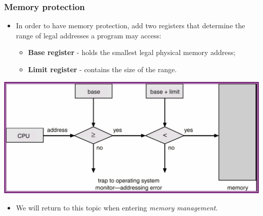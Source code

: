 \documentclass[CJKutf8,xcolor=pdftex,dvipsnames,table]{beamer}
\begin{document}
\begin{CJK*}{UTF8}{song}
  \begin{frame}
    \frametitle{Memory protection} \pause
    \begin{itemize}
    \item{In order to have memory protection, add two registers that determine the range of legal addresses a program may access:} \pause
      \begin{itemize}
      \item{\textbf{Base register} \pause - holds the smallest legal physical memory address;} \pause
      \item{\textbf{Limit register} \pause - contains the size of the range.} \pause
      \end{itemize}
    \end{itemize}
    \begin{center}
      \includegraphics[scale=0.4]{v6f2-10} \pause
    \end{center}
    \begin{itemize}
    \item{We will return to this topic when entering \emph{memory management}.}
    \end{itemize}
  \end{frame}


\end{CJK*}
\end{document}
